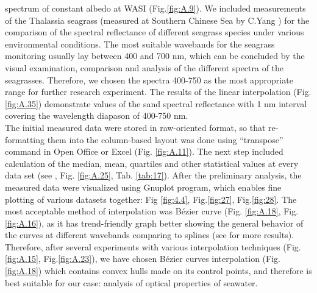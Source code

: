 \documentclass[11pt]{article}
\begin{document}
spectrum of constant albedo at \ac{WASI} (Fig.\ref{fig:A.9}). 
We included measurements of the Thalassia seagrass
(measured at Southern Chinese Sea by C.Yang \cite{Yang10} \label{Yang10}) for the comparison of the spectral reflectance of
different seagrass species under various environmental conditions.
The most suitable wavebands for the seagrass monitoring usually lay between 400 and 700 nm,
which can be concluded by the visual examination, comparison and analysis of the different spectra of
the seagrasses. Therefore, we chosen the spectra 400-750 as the most appropriate range for
further research experiment. The results of the linear interpolation (Fig.\ref{fig:A.35}) demonstrate values of the
sand spectral reflectance with 1 nm interval covering the wavelength diapason of 400-750 nm.\\
The initial measured data were stored in raw-oriented format, so that re-formatting them into the
column-based layout was done using “transpose” command in Open Office or Excel (Fig. \ref{fig:A.11}). The next step included
calculation of the median, mean, quartiles and other statistical values at every data set (see , Fig. \ref{fig:A.25}, Tab. \ref{tab:17}).
After the preliminary analysis, the measured data were visualized using Gnuplot program, which
enables fine plotting of various datasets together: Fig \ref{fig:4.4}, Fig.\ref{fig:27}, Fig.\ref{fig:28}. The most acceptable method of interpolation was B\'ezier curve (Fig. \ref{fig:A.18}, Fig. \ref{fig:A.16}),
as it has trend-friendly graph better showing the general behavior of the curves at different wavebands
comparing to splines (see  for more results). 
Therefore, after several experiments with
various interpolation techniques (Fig.\ref{fig:A.15}, Fig.\ref{fig:A.23}), we have chosen B\'ezier curves interpolation (Fig.\ref{fig:A.18}) which contains convex
hulls made on its control points, and therefore is best suitable for our case: analysis of optical
properties of seawater.
\end{document}
